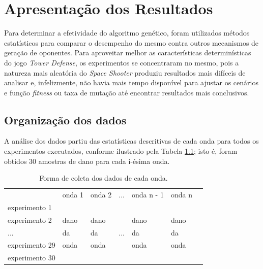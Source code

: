 
\chapter{Apresentação dos Resultados}
\label{cap:apresentacao}

Para determinar a efetividade do algoritmo genético, foram utilizados métodos estatísticos para comparar o desempenho do mesmo contra outros mecanismos de geração de oponentes. Para aproveitar melhor as características determinísticas do jogo \textit{Tower Defense}, os experimentos se concentraram no mesmo, pois a natureza mais aleatória do \textit{Space Shooter} produziu resultados mais difíceis de analisar e, infelizmente, não havia mais tempo disponível para ajustar os cenários e função \textit{fitness} ou taxa de mutação até encontrar resultados mais conclusivos.

\section{Organização dos dados}
\label{sec:a-organizacao}

A análise dos dados partiu das estatísticas descritivas de cada onda para todos os experimentos executados, conforme ilustrado pela Tabela \ref{tab:colunas}; isto é, foram obtidos 30 amostras de dano para cada i-ésima onda.

\begin{table}
\caption{Forma de coleta dos dados de cada onda.}
\begin{tabular}{l|l|l|l|l|l|l}
\cline{2-6}
               & onda 1 & onda 2 & ... & onda n - 1 & onda n \\ \cline{2-6}
experimento 1  &        &        &     &            &         \\
experimento 2  &  dano  &  dano  &     &  dano      &  dano   \\
...            &  da    &  da    & ... &  da        &  da     \\
experimento 29 &  onda  &  onda  &     &  onda      &  onda   \\
experimento 30 &        &        &     &            &         \\ \cline{2-6}
\end{tabular}
\label{tab:colunas}
\end{table}

